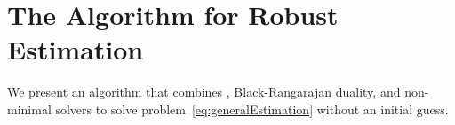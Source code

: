 
\section{The \GNC Algorithm for Robust Estimation}
\label{sec:GNCalgorithm}

We present an algorithm that combines \GNC, Black-Rangarajan duality, and non-minimal solvers to 
solve problem~\eqref{eq:generalEstimation} without an initial guess. 


